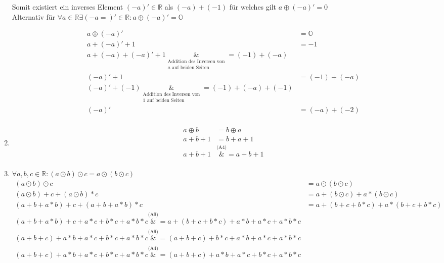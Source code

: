 \documentclass{article}
\begin{document}
\begin{enumerate}[label=(A\arabic*)]
  Somit existiert ein inverses Element $(-a)' \in \mathbb{R}$ als $(-a) + (-1)$ für welches gilt
  $a \oplus (-a)' = 0$ \\

  Alternativ für $\forall a \in \mathbb{R} \exists (-a=)' \in \mathbb{R} \colon a \oplus (-a)' = \mathbb{O}$

  \begin{align*}
    a \oplus (-a)' &= \mathbb{O} \\
    a + (-a)' + 1 &= -1 \\ 
    a + (-a) + (-a)' + 1 \underset{\substack{\text{Addition des Inversen von} \\ a \text{ auf beiden Seiten}}}&{=} (-1) + (-a)\\
    (-a)' + 1 &= (-1) + (-a) \\
    (-a)' + (-1) \underset{\substack{\text{Addition des Inversen von} \\ 1 \text{ auf beiden Seiten}}}&{=} (-1) + (-a) + (-1)\\
    (-a)' &= (-a) + (-2) \\
  \end{align*}

\item
  \begin{align*}
    a \oplus b &= b \oplus a \\
    a + b + 1 &= b + a + 1 \\
    a + b + 1 &\overset{\text{(A4)}}&{=} a + b + 1 \\
  \end{align*}

\item $\forall a,b,c \in \mathbb{R} \colon (a \odot b) \odot c = a \odot (b \odot c)$
  \begin{align*}
    (a \odot b) \odot c &= a \odot (b \odot c) \\
    (a \odot b) + c + (a \odot b) * c &= a + (b \odot c) + a * (b \odot c) \\
    (a + b + a * b) + c + (a + b + a * b) * c &= a + (b + c + b * c) + a * (b + c + b * c) \\
    (a + b + a * b) + c + a * c + b * c + a * b * c \overset{\text{(A9)}}&{=} a + (b + c + b * c) + a * b + a * c + a* b * c \\
    (a + b + c) + a * b + a * c + b * c + a * b * c \overset{\text{(A9)}}&{=} (a + b + c) + b * c + a * b + a * c + a* b * c \\
    (a + b + c) + a * b + a * c + b * c + a * b * c \overset{\text{(A4)}}&{=} (a + b + c) + a * b + a * c + b * c + a * b * c \\
  \end{align*}


\end{enumerate}
\end{document}
